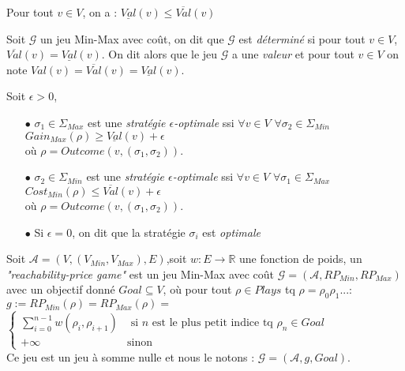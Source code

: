 \begin{propriete}
	Pour tout $v \in V$, on a : $\underline{Val}(v) \leq \overline{Val}(v)$
\end{propriete}


\begin{defi}
		Soit $\mathcal{G}$ un jeu Min-Max avec coût, on dit que $\mathcal{G}$ est \textit{déterminé} si pour tout $v \in V$, $\overline{Val}(v) = \underline{Val}(v)$. On dit alors que le jeu $\mathcal{G}$ a une \textit{valeur} et pour tout $v \in V$ on note $Val(v) = \overline{Val}(v) = \underline{Val}(v)$.
\end{defi}


\begin{defi}
	Soit $\epsilon > 0$,
	\begin{enumerate}
	\item[$\bullet$] $\sigma _{1} \in \Sigma _{Max}$ est une \textit{stratégie $\epsilon$-optimale} ssi $\forall v \in V $ $ \forall \sigma _{2}\in \Sigma_{Min}$ $ Gain_{Max}(\rho) \geq \underline{Val}(v) + \epsilon  $\\ où $\rho = Outcome(v, (\sigma _{1},\sigma _{2}))$.
	\item[$\bullet$] $\sigma _{2} \in \Sigma _{Min}$ est une \textit{stratégie $\epsilon$-optimale} ssi $\forall v \in V $ $ \forall \sigma _{1}\in \Sigma_{Max}$ $Cost_{Min}(\rho) \leq \overline{Val}(v) + \epsilon $\\ où $\rho = Outcome(v, (\sigma _{1},\sigma _{2}))$.
	\item[$\bullet$] Si $\epsilon = 0$, on dit que la stratégie $\sigma _{i}$ est \textit{optimale}
	\end{enumerate}
\end{defi}


\begin{defi}
	Soit $\mathcal{A} = (V, (V_{Min}, V_{Max}), E) $,soit $w: E \rightarrow \mathbb{R}$ une fonction de poids,
	un \textit{"reachability-price game"} est un jeu Min-Max avec coût $\mathcal{G} = (\mathcal{A},RP_{Min},RP_{Max})$\\ avec un objectif donné $Goal \subseteq V$, où pour tout $\rho \in Plays$ tq $\rho = \rho _{0}\rho _{1}...$:\\
	
	$g := RP_{Min}(\rho)=RP_{Max}(\rho) =$ $\begin{cases}
									\sum_{i = 0}^{n-1} w(\rho_{i},\rho_{i+1}) & \text{ si } n \text{ est le plus petit indice tq } \rho_{n}\in 					  Goal\\
									+\infty & \text{sinon}
									\end{cases}$ \\
									
  \noindent Ce jeu est un jeu à somme nulle et nous le notons : $\mathcal{G} = (\mathcal{A}, g , Goal)$.
\end{defi}

